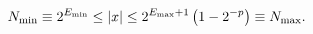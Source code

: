 \[N_{{\rm min}}\equiv 2^{E_{{\rm min}}}\leq|x|\leq 2^{E_{{\rm max}}+1}\left(1-2^%
{-p}\right)\equiv N_{{\rm max}}.\]